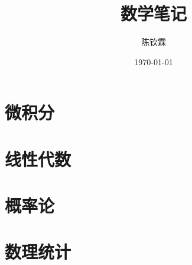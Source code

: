 \documentclass[hyperref,a4paper,UTF8]{ctexbook}
\theoremstyle{definition} \newtheorem{definition}{定义}[chapter]
\theoremstyle{definition} \newtheorem{theorem}[definition]{定理}
\theoremstyle{definition} \newtheorem{lemma}[definition]{引理}
\theoremstyle{definition} \newtheorem{corollary}[definition]{推论}
\theoremstyle{remark} \newtheorem*{remark}{Remark}
\begin{document}
\author{陈钦霖}
\title{数学笔记}
\date{\today}

\maketitle
\tableofcontents

\part{微积分}



\part{线性代数}







\part{概率论}





\part{数理统计}

\end{document}
